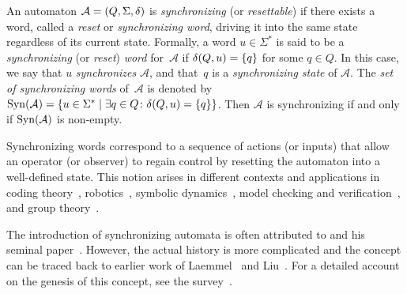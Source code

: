 
\label{def:set_of_sync_words} 
 
An automaton $\mathcal A = (Q, \Sigma, \delta)$ 
is \emph{synchronizing} (or \emph{resettable})
if there exists a word, called a \emph{reset} or \emph{synchronizing word},
driving it into the same state regardless of its current state. 
Formally, a word $u \in \Sigma^*$ is said to be a \emph{synchronizing} (or \emph{reset}) \emph{word} for~$\mathcal A$
if $\delta(Q,u) = \{q\}$ for some $q \in Q$.
In this case, 
we say that $u$ \emph{synchronizes} $\mathcal A$, and that~$q$ is a \emph{synchronizing state} of $\mathcal A$.
The \emph{set of synchronizing words} of~$\mathcal A$
is denoted by $\operatorname{Syn}(\mathcal A) = \{ u \in \Sigma^* \mid \exists q \in Q \colon \delta(Q, u) = \{q\} \}$.
Then $\mathcal A$ is synchronizing if and only if $\operatorname{Syn}(\mathcal A)$ is non-empty.

Synchronizing words
correspond to a sequence of actions (or inputs) that
allow an operator (or observer) to regain
control by resetting the automaton into a well-defined state.
This notion arises in different contexts and applications
in coding theory~\cite{DBLP:books/daglib/0025093,DBLP:journals/iandc/Jurgensen08,KariVolkov2021}, robotics~\cite{Eppstein90,DBLP:journals/algorithmica/Goldberg93,DBLP:conf/focs/Natarajan86,DBLP:conf/lata/Volkov08}, 
symbolic dynamics~\cite{trahtman09}, model checking and verification~\cite{Sandberg04}, and group theory~\cite{ArCamSt2017}.

The introduction of synchronizing automata is often attributed to \Cerny and
his seminal paper~\cite{Cer64}. However, the actual history is more complicated
and the concept can be traced back to earlier work of Laemmel~\cite{Laemmel63}
and Liu~\cite{Liu63}.
For a detailed account on the genesis of this concept,
see the survey~\cite[Sect.~1.3]{Volkov22}.
